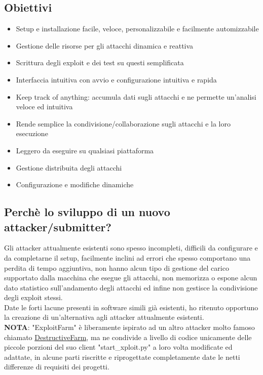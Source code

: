 \documentclass[11pt]{article}
\begin{document}
\subsection{Obiettivi}
\begin{itemize}
    \item Setup e installazione facile, veloce, personalizzabile e facilmente automizzabile
    \item Gestione delle risorse per gli attacchi dinamica e reattiva
    \item Scrittura degli exploit e dei test su questi semplificata
    \item Interfaccia intuitiva con avvio e configurazione intuitiva e rapida
    \item Keep track of anything: accumula dati sugli attacchi e ne permette un'analisi veloce ed intuitiva
    \item Rende semplice la condivisione/collaborazione sugli attacchi e la loro esecuzione
    \item Leggero da eseguire su qualsiasi piattaforma
    \item Gestione distribuita degli attacchi
    \item Configurazione e modifiche dinamiche
\end{itemize}
\subsection{Perchè lo sviluppo di un nuovo attacker/submitter?}
Gli attacker attualmente esistenti sono spesso incompleti, difficili da configurare e da completarne il setup, facilmente inclini ad errori che spesso comportano una perdita di tempo aggiuntiva, non hanno alcun tipo di gestione del carico supportato dalla macchina che esegue gli attacchi, non memorizza o espone alcun dato statistico sull'andamento degli attacchi ed infine non gestisce la condivisione degli exploit stessi.\\
Date le forti lacune presenti in software simili già esistenti, ho ritenuto opportuno la creazione di un'alternativa agli attacker attualmente esistenti.\\
\textbf{NOTA}: "ExploitFarm" è liberamente ispirato ad un altro attacker molto famoso chiamato \href{https://github.com/DestructiveVoice/DestructiveFarm}{DestructiveFarm}, ma ne condivide a livello di codice unicamente delle piccole porzioni del suo client "start\_xploit.py" a loro volta modificate ed adattate, in alcune parti riscritte e riprogettate completamente date le netti differenze di requisiti dei progetti.
\end{document}
